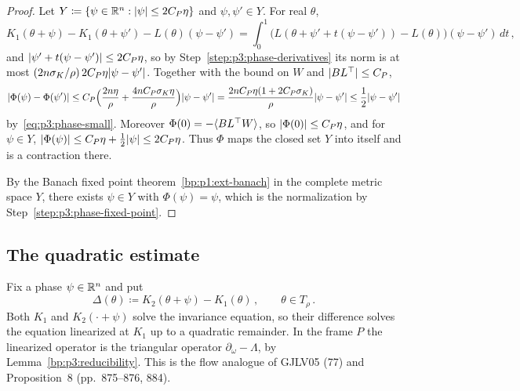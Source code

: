 \begin{proof}
\label{step:p3:phase-contraction}
Let $Y\coloneqq\{\psi\in\mathbb{R}^n:\lvert \psi\rvert\le2C_P\eta\}$ and $\psi,\psi'\in Y$. For real $\theta$,
\begin{equation*}
K_1(\theta+\psi)-K_1(\theta+\psi')-L(\theta)(\psi-\psi')=\int_0^1\bigl(L(\theta+\psi'+t(\psi-\psi'))
-L(\theta)\bigr)(\psi-\psi')\,dt\,,
\end{equation*}
and $\lvert \psi'+t(\psi-\psi')\rvert\le2C_P\eta$, so by Step~\ref{step:p3:phase-derivatives} its norm is at
most $(2n\sigma_K/\rho)\,2C_P\eta\lvert \psi-\psi'\rvert$. Together with the bound on $W$ and
$\lvert BL^\top\rvert\le C_P$,
\begin{equation*}
\lvert \Phi(\psi)-\Phi(\psi')\rvert\le C_P\Bigl(\frac{2n\eta}{\rho}+\frac{4nC_P\sigma_K\eta}{\rho}\Bigr)
\lvert \psi-\psi'\rvert=\frac{2nC_P\eta(1+2C_P\sigma_K)}{\rho}\lvert \psi-\psi'\rvert\le\frac12\lvert \psi-\psi'\rvert
\end{equation*}
by~\eqref{eq:p3:phase-small}. Moreover $\Phi(0)=-\langle BL^\top W\rangle$, so $\lvert \Phi(0)\rvert\le C_P\eta$, and
for $\psi\in Y$, $\lvert \Phi(\psi)\rvert\le C_P\eta+\frac12\lvert \psi\rvert\le2C_P\eta$. Thus $\Phi$ maps the closed
set $Y$ into itself and is a contraction there.

\label{step:p3:phase-conclusion}
By the Banach fixed point theorem~\ref{bp:p1:ext-banach} in the complete metric space $Y$, there exists $\psi\in Y$ with
$\Phi(\psi)=\psi$, which is the normalization by Step~\ref{step:p3:phase-fixed-point}.
\end{proof}


\subsection{The quadratic estimate}\label{bp:p3:quadratic-section}

Fix a phase $\psi\in\mathbb{R}^n$ and put
\begin{equation}\label{eq:p3:Delta}
\Delta(\theta)\coloneqq K_2(\theta+\psi)-K_1(\theta)\,,\qquad\theta\in T_\rho\,.
\end{equation}
Both $K_1$ and $K_2(\cdot+\psi)$ solve the invariance equation, so their difference solves the equation
linearized at $K_1$ up to a quadratic remainder. In the frame $P$ the linearized operator is the
triangular operator $\partial_\omega-\Lambda$, by Lemma~\ref{bp:p3:reducibility}. This is the flow
analogue of GJLV05 (77) and Proposition~8 (pp.~875--876, 884).

